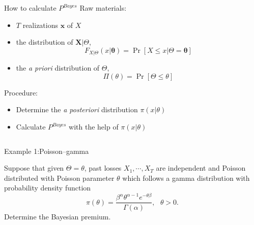 \documentclass[11pt]{beamer}
\begin{document}
\begin{frame}{How to calculate $P^{Bayes}$}
Raw materials:
\begin{itemize}
\item $T$ \alert{realizations $\mathbf{x}$} of $X$
\item the \alert{distribution of $\mathbf{X}|\Theta$}, $$F_{X|\Theta}(x|\mathbf{\theta})=\Pr[X \le x|\Theta=\mathbf{\theta}]$$
\item the \alert{\emph{a priori} distribution of $\Theta$}, $$\Pi(\theta)=\Pr[\Theta \le \theta]$$
\end{itemize}
Procedure:
\begin{itemize}
\item Determine the \emph{a posteriori} distribution $\pi(x|\theta)$
\item Calculate $P^{Bayes}$ with the help of $\pi(x|\theta)$
\end{itemize}
\begin{columns}
\end{columns}
\end{frame}
\begin{frame}{Example 1:Poisson--gamma}
\vspace{-2.5 cm}

Suppose that given $\Theta=\theta$, past losses $X_1,\cdots,X_T$ are independent and Poisson distributed with Poisson parameter $\theta$ which follows a gamma distribution with probability density function
$$\pi(\theta)=\frac{\beta^\alpha\theta^{\alpha-1}e^{-\theta\beta}}{\Gamma(\alpha)},\ \ \ \theta>0.$$
Determine the Bayesian premium.

\end{frame}
\begin{frame}

\end{frame}
\begin{frame}

\end{frame}
\begin{frame}

\end{frame}
\end{document}
